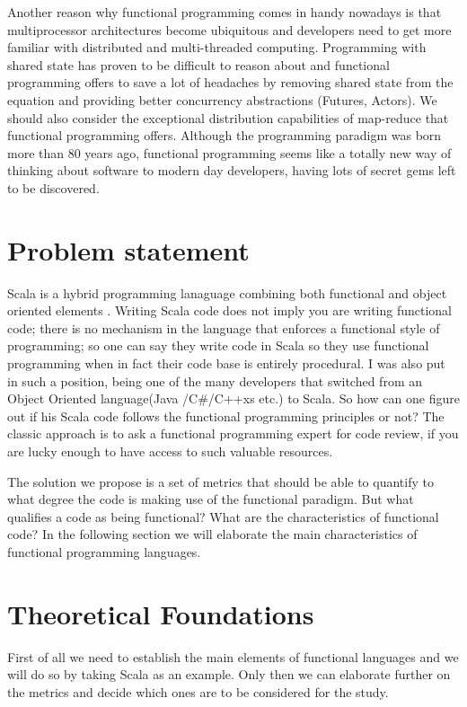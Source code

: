 \documentclass{article}
\begin{document}
Another reason why functional programming comes in handy nowadays is that multiprocessor architectures become ubiquitous and developers need to get more familiar with distributed and multi-threaded computing. Programming with shared state has proven to be  difficult to reason about and functional programming offers to save a lot of headaches by removing shared state from the equation and providing better concurrency abstractions (Futures, Actors). We should also consider  the exceptional distribution capabilities of map-reduce that functional programming offers. Although the programming paradigm was born more than 80 years ago, functional programming seems like a totally new way of thinking about software to modern day developers, having lots of secret gems left to be discovered. \par

\section {Problem statement}
Scala is a hybrid programming lanaguage combining both  functional and  object oriented elements \cite{scalalang:1}. Writing Scala code does not imply you are writing functional code;  there is no mechanism in the language that enforces a functional style of programming; so one can say they write code in Scala so they use functional programming when in fact their code base is entirely procedural. I was also put in such a position,  being one of the many  developers that switched from an Object Oriented language(Java /C\#/C++xs etc.)  to Scala. So how can one figure out if his Scala code follows the functional programming principles or not? The classic approach is to ask a functional programming expert for code review, if you are lucky enough to have access to such valuable resources. \par

The solution we propose is a set of metrics that should be able to quantify to what degree the code is making use of the functional paradigm. But what  qualifies a code as being functional? What are the characteristics of functional code? In the following section we will elaborate the main characteristics of functional programming languages.\par


\section {Theoretical Foundations}
First of all we need to establish the main elements of functional languages and we will do so by taking Scala as an example. Only then we can elaborate further on the metrics and decide which ones are to be considered for the study. \par
\end{document}
